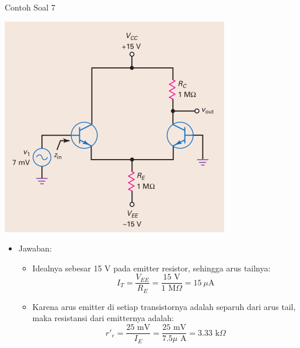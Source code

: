 \documentclass[aspectratio=169]{beamer}
\begin{document}
\begin{frame}{Contoh Soal 7}
	\begin{multicols}{2}
		\begin{center}
			\includegraphics[height=0.7\textheight]{gambar/01.contoh_soal_07}
		\end{center}
		\columnbreak
		\begin{itemize}
			\item Jawaban:
			\begin{itemize}
				\item Idealnya sebesar 15 V pada emitter resistor, sehingga arus tailnya:
				\[ I_T = \frac{V_{EE}}{R_E} = \frac{15 \text{ V}}{1 \text{ M}\Omega} = 15~\mu\text{A} \]
				\item Karena arus emitter di setiap transistornya adalah separuh dari arus tail, maka resistansi dari emitternya adalah:
				\[ r'_e = \frac{25 \text{ mV}}{ I_E} =\frac{25 \text{ mV}}{7.5 \mu\text{ A}} = 3.33 \text{ k}\Omega \]
			\end{itemize}
		\end{itemize}
	\end{multicols}
\end{frame}
\end{document}
